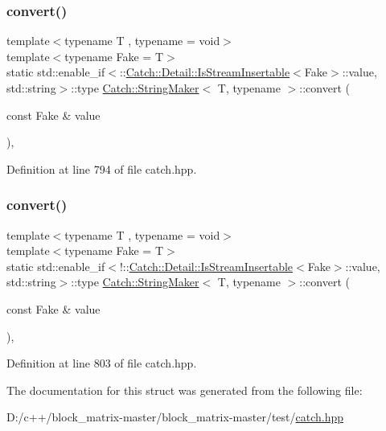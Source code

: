 \subsubsection{\texorpdfstring{convert()}{convert()}\hspace{0.1cm}{\footnotesize\ttfamily [1/2]}}
{\footnotesize\ttfamily template$<$typename T , typename  = void$>$ \\
template$<$typename Fake  = T$>$ \\
static std\+::enable\+\_\+if$<$\+::\mbox{\hyperlink{class_catch_1_1_detail_1_1_is_stream_insertable}{Catch\+::\+Detail\+::\+Is\+Stream\+Insertable}}$<$Fake$>$\+::value, std\+::string$>$\+::type \mbox{\hyperlink{struct_catch_1_1_string_maker}{Catch\+::\+String\+Maker}}$<$ T, typename $>$\+::convert (\begin{DoxyParamCaption}\item[{const Fake \&}]{value }\end{DoxyParamCaption})\hspace{0.3cm}{\ttfamily [inline]}, {\ttfamily [static]}}



Definition at line 794 of file catch.\+hpp.

\mbox{\label{struct_catch_1_1_string_maker_a68bb548de0e5ad364228b1ca3dd2f561}} 
\subsubsection{\texorpdfstring{convert()}{convert()}\hspace{0.1cm}{\footnotesize\ttfamily [2/2]}}
{\footnotesize\ttfamily template$<$typename T , typename  = void$>$ \\
template$<$typename Fake  = T$>$ \\
static std\+::enable\+\_\+if$<$!\+::\mbox{\hyperlink{class_catch_1_1_detail_1_1_is_stream_insertable}{Catch\+::\+Detail\+::\+Is\+Stream\+Insertable}}$<$Fake$>$\+::value, std\+::string$>$\+::type \mbox{\hyperlink{struct_catch_1_1_string_maker}{Catch\+::\+String\+Maker}}$<$ T, typename $>$\+::convert (\begin{DoxyParamCaption}\item[{const Fake \&}]{value }\end{DoxyParamCaption})\hspace{0.3cm}{\ttfamily [inline]}, {\ttfamily [static]}}



Definition at line 803 of file catch.\+hpp.



The documentation for this struct was generated from the following file\+:\begin{DoxyCompactItemize}
\item 
D\+:/c++/block\+\_\+matrix-\/master/block\+\_\+matrix-\/master/test/\mbox{\hyperlink{catch_8hpp}{catch.\+hpp}}\end{DoxyCompactItemize}
